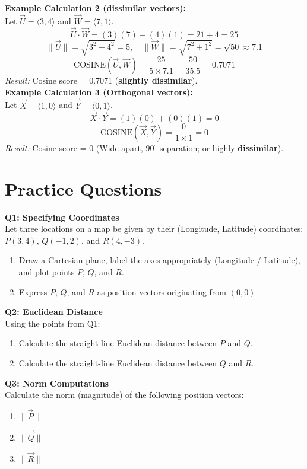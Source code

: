 \documentclass[11pt]{article}
\begin{document}
\textbf{Example Calculation 2 (dissimilar vectors):} \\
Let $\vec{U} = \langle 3, 4 \rangle$ and $\vec{W} = \langle 7, 1 \rangle$.
\[ \vec{U} \cdot \vec{W} = (3)(7) + (4)(1) = 21 + 4 = 25 \]
\[ \|\vec{U}\| = \sqrt{3^2+4^2}=5, \quad \|\vec{W}\| = \sqrt{7^2+1^2}= \sqrt{50} \approx 7.1 \]
\[ \text{COSINE}(\vec{U},\vec{W}) = \frac{25}{5 \times 7.1} = \frac{50}{35.5} = 0.7071 \]
\textit{Result:} Cosine score = 0.7071 (\textbf{slightly dissimilar}).
\\

\textbf{Example Calculation 3 (Orthogonal vectors):} \\
Let $\vec{X} = \langle 1, 0 \rangle$ and $\vec{Y} = \langle 0, 1 \rangle$.
\[ \vec{X} \cdot \vec{Y} = (1)(0) + (0)(1) = 0 \]
\[ \text{COSINE}(\vec{X},\vec{Y}) = \frac{0}{1 \times 1} = 0 \]
\textit{Result:} Cosine score = 0 (Wide apart, $90^\circ$ separation; or highly \textbf{dissimilar}).

\newpage
\section*{Practice Questions}

\textbf{Q1: Specifying Coordinates}\\
Let three locations on a map be given by their (Longitude, Latitude) coordinates: $P(3, 4)$, $Q(-1, 2)$, and $R(4, -3)$.
\begin{enumerate}
    \item[(a)] Draw a Cartesian plane, label the axes appropriately (Longitude / Latitude), and plot points $P$, $Q$, and $R$.
    \item[(b)] Express $P$, $Q$, and $R$ as position vectors originating from $(0,0)$.
\end{enumerate}

\textbf{Q2: Euclidean Distance}\\
Using the points from Q1:
\begin{enumerate}
    \item[(a)] Calculate the straight-line Euclidean distance between $P$ and $Q$.
    \item[(b)] Calculate the straight-line Euclidean distance between $Q$ and $R$.
\end{enumerate}

\textbf{Q3: Norm Computations}\\
Calculate the norm (magnitude) of the following position vectors:
\begin{enumerate}
    \item[(a)] $\|\vec{P}\|$
    \item[(b)] $\|\vec{Q}\|$
    \item[(c)] $\|\vec{R}\|$
\end{enumerate}
\end{document}
